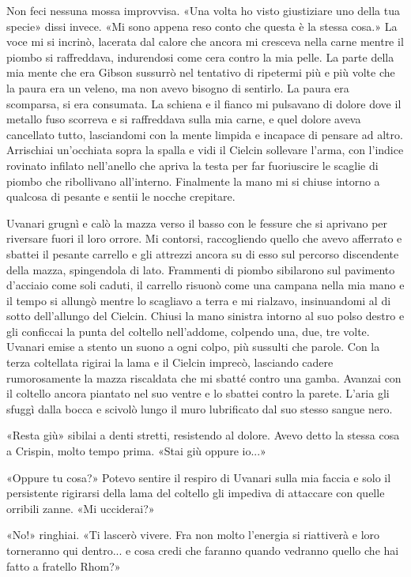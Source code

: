 Non feci nessuna mossa improvvisa. «Una volta ho visto giustiziare uno
della tua specie» dissi invece. «Mi sono appena reso conto che questa è
la stessa cosa.» La voce mi si incrinò, lacerata dal calore che ancora
mi cresceva nella carne mentre il piombo si raffreddava, indurendosi
come cera contro la mia pelle. La parte della mia mente che era Gibson
sussurrò nel tentativo di ripetermi più e più volte che la paura era un
veleno, ma non avevo bisogno di sentirlo. La paura era scomparsa, si era
consumata. La schiena e il fianco mi pulsavano di dolore dove il metallo
fuso scorreva e si raffreddava sulla mia carne, e quel dolore aveva
cancellato tutto, lasciandomi con la mente limpida e incapace di pensare
ad altro. Arrischiai un'occhiata sopra la spalla e vidi il Cielcin
sollevare l'arma, con l'indice rovinato infilato nell'anello che apriva
la testa per far fuoriuscire le scaglie di piombo che ribollivano
all'interno. Finalmente la mano mi si chiuse intorno a qualcosa di
pesante e sentii le nocche crepitare.

Uvanari grugnì e calò la mazza verso il basso con le fessure che si
aprivano per riversare fuori il loro orrore. Mi contorsi, raccogliendo
quello che avevo afferrato e sbattei il pesante carrello e gli attrezzi
ancora su di esso sul percorso discendente della mazza, spingendola di
lato. Frammenti di piombo sibilarono sul pavimento d'acciaio come soli
caduti, il carrello risuonò come una campana nella mia mano e il tempo
si allungò mentre lo scagliavo a terra e mi rialzavo, insinuandomi al di
sotto dell'allungo del Cielcin. Chiusi la mano sinistra intorno al suo
polso destro e gli conficcai la punta del coltello nell'addome, colpendo
una, due, tre volte. Uvanari emise a stento un suono a ogni colpo, più
sussulti che parole. Con la terza coltellata rigirai la lama e il
Cielcin imprecò, lasciando cadere rumorosamente la mazza riscaldata che
mi sbatté contro una gamba. Avanzai con il coltello ancora piantato nel
suo ventre e lo sbattei contro la parete. L'aria gli sfuggì dalla bocca
e scivolò lungo il muro lubrificato dal suo stesso sangue nero.

«Resta giù» sibilai a denti stretti, resistendo al dolore. Avevo detto
la stessa cosa a Crispin, molto tempo prima. «Stai giù oppure io...»

«Oppure tu cosa?» Potevo sentire il respiro di Uvanari sulla mia faccia
e solo il persistente rigirarsi della lama del coltello gli impediva di
attaccare con quelle orribili zanne. «Mi ucciderai?»

«No!» ringhiai. «Ti lascerò vivere. Fra non molto l'energia si
riattiverà e loro torneranno qui dentro... e cosa credi che faranno
quando vedranno quello che hai fatto a fratello Rhom?»

